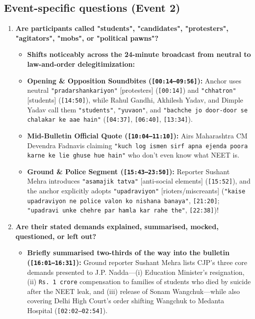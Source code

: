 \documentclass[10pt,a4paper]{article}
\begin{document}
\subsection*{Event-specific questions (Event 2)}
\begin{enumerate}[leftmargin=1.6em, itemsep=4pt, topsep=4pt]
  \item \textbf{Are participants called "students", "candidates", "protesters", "agitators", "mobs", or "political pawns"?}
  \begin{itemize}[leftmargin=1.4em, itemsep=2pt, topsep=2pt]
    \item \textbf{Shifts noticeably across the 24-minute broadcast from neutral to law-and-order delegitimization:}
    \item \textbf{Opening \& Opposition Soundbites (\texttt{[00:14--09:56]}):} Anchor uses neutral \texttt{"pradarshankariyon"} [protesters] (\texttt{[00:14]}) and \texttt{"chhatron"} [students] (\texttt{[14:50]}), while Rahul Gandhi, Akhilesh Yadav, and Dimple Yadav call them \texttt{"students"}, \texttt{"yuvaon"}, and \texttt{"bachche jo door-door se chalakar ke aae hain"} (\texttt{[04:37]}, \texttt{[06:40]}, \texttt{[13:34]}).
    \item \textbf{Mid-Bulletin Official Quote (\texttt{[10:04--11:10]}):} Airs Maharashtra CM Devendra Fadnavis claiming \texttt{"kuch log ismen sirf apna ejenda poora karne ke lie ghuse hue hain"} who don't even know what NEET is.
    \item \textbf{Ground \& Police Segment (\texttt{[15:43--23:50]}):} Reporter Sushant Mehra introduces \texttt{"asamajik tatva"} [anti-social elements] (\texttt{[15:52]}), and the anchor explicitly adopts \texttt{"upadraviyon"} [rioters/miscreants] (\texttt{"kaise upadraviyon ne police valon ko nishana banaya"}, \texttt{[21:20]}; \texttt{"upadravi unke chehre par hamla kar rahe the"}, \texttt{[22:38]})!
  \end{itemize}
  \item \textbf{Are their stated demands explained, summarised, mocked, questioned, or left out?}
  \begin{itemize}[leftmargin=1.4em, itemsep=2pt, topsep=2pt]
    \item \textbf{Briefly summarised two-thirds of the way into the bulletin (\texttt{[16:01--16:31]}):} Ground reporter Sushant Mehra lists CJP's three core demands presented to J.P. Nadda---(i) Education Minister's resignation, (ii) \texttt{Rs.\,1 crore} compensation to families of students who died by suicide after the NEET leak, and (iii) release of Sonam Wangchuk---while also covering Delhi High Court's order shifting Wangchuk to Medanta Hospital (\texttt{[02:02--02:54]}).

\end{itemize}
\end{enumerate}
\end{document}
